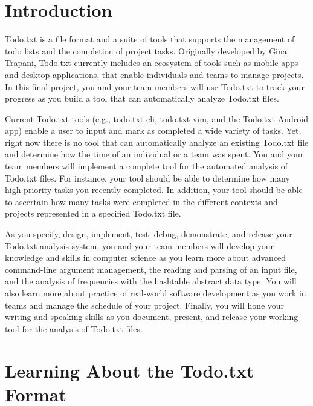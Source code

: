 


\usepackage[compact]{titlesec}


\section*{Introduction}

Todo.txt is a file format and a suite of tools that supports the management of todo lists and the completion of project
tasks. Originally developed by Gina Trapani, Todo.txt currently includes an ecosystem of tools such as mobile apps and
desktop applications, that enable individuals and teams to manage projects. In this final project, you and your team
members will use Todo.txt to track your progress as you build a tool that can automatically analyze Todo.txt files.

Current Todo.txt tools (e.g., todo.txt-cli, todo.txt-vim, and the Todo.txt Android app) enable a user to input and mark
as completed a wide variety of tasks.  Yet, right now there is no tool that can automatically analyze an existing
Todo.txt file and determine how the time of an individual or a team was spent. You and your team members will implement
a complete tool for the automated analysis of Todo.txt files.  For instance, your tool should be able to determine how
many high-priority tasks you recently completed.  In addition, your tool should be able to ascertain how many tasks were
completed in the different contexts and projects represented in a specified Todo.txt file. 

As you specify, design, implement, test, debug, demonstrate, and release your Todo.txt analysis system, you and your
team members will develop your knowledge and skills in computer science as you learn more about advanced command-line
argument management, the reading and parsing of an input file, and the analysis of frequencies with the hashtable
abstract data type. You will also learn more about practice of real-world software development as you work in teams and
manage the schedule of your project. Finally, you will hone your writing and speaking skills as you document, present,
and release your working tool for the analysis of Todo.txt files.

\section*{Learning About the Todo.txt Format}

